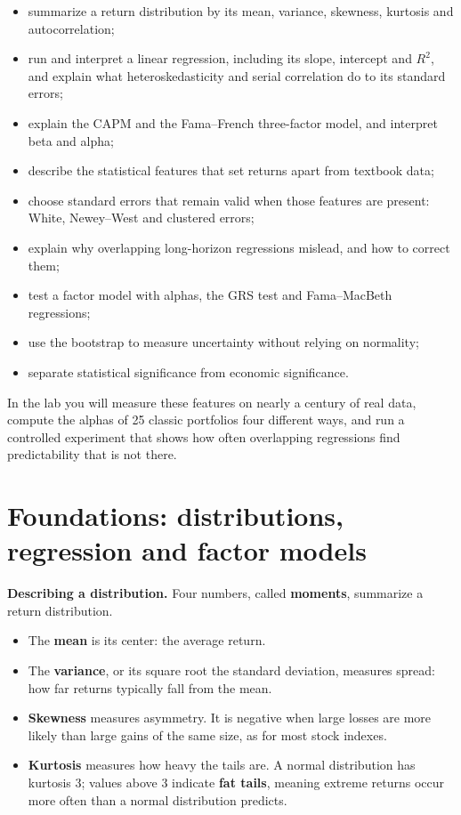 \begin{itemize}
  \item summarize a return distribution by its mean, variance, skewness, kurtosis and autocorrelation;
  \item run and interpret a linear regression, including its slope, intercept and $R^2$, and explain what heteroskedasticity and serial correlation do to its standard errors;
  \item explain the CAPM and the Fama--French three-factor model, and interpret beta and alpha;
  \item describe the statistical features that set returns apart from textbook data;
  \item choose standard errors that remain valid when those features are present: White, Newey--West and clustered errors;
  \item explain why overlapping long-horizon regressions mislead, and how to correct them;
  \item test a factor model with alphas, the GRS test and Fama--MacBeth regressions;
  \item use the bootstrap to measure uncertainty without relying on normality;
  \item separate statistical significance from economic significance.
\end{itemize}

In the lab you will measure these features on nearly a century of real data, compute the alphas of 25 classic portfolios four different ways, and run a controlled experiment that shows how often overlapping regressions find predictability that is not there.

\section{Foundations: distributions, regression and factor models}
\label{sec:03-foundations}

\textbf{Describing a distribution.} Four numbers, called \textbf{moments}, summarize a return distribution.

\begin{itemize}
  \item The \textbf{mean} is its center: the average return.
  \item The \textbf{variance}, or its square root the standard deviation, measures spread: how far returns typically fall from the mean.
  \item \textbf{Skewness} measures asymmetry. It is negative when large losses are more likely than large gains of the same size, as for most stock indexes.
  \item \textbf{Kurtosis} measures how heavy the tails are. A normal distribution has kurtosis 3; values above 3 indicate \textbf{fat tails}, meaning extreme returns occur more often than a normal distribution predicts.
\end{itemize}

